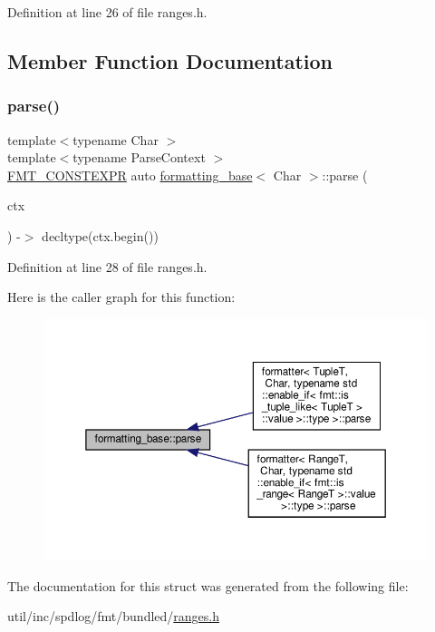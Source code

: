 Definition at line 26 of file ranges.\+h.



\subsection{Member Function Documentation}
\mbox{\label{structformatting__base_a938ab5ae1cf866f08caa3314d779c03e}} 
\subsubsection{\texorpdfstring{parse()}{parse()}}
{\footnotesize\ttfamily template$<$typename Char $>$ \\
template$<$typename Parse\+Context $>$ \\
\hyperlink{core_8h_a69201cb276383873487bf68b4ef8b4cd}{F\+M\+T\+\_\+\+C\+O\+N\+S\+T\+E\+X\+PR} auto \hyperlink{structformatting__base}{formatting\+\_\+base}$<$ Char $>$\+::parse (\begin{DoxyParamCaption}\item[{Parse\+Context \&}]{ctx }\end{DoxyParamCaption}) -\/$>$ decltype(ctx.\+begin()) \hspace{0.3cm}{\ttfamily [inline]}}



Definition at line 28 of file ranges.\+h.

Here is the caller graph for this function\+:
\nopagebreak
\begin{figure}[H]
\begin{center}
\leavevmode
\includegraphics[width=350pt]{structformatting__base_a938ab5ae1cf866f08caa3314d779c03e_icgraph}
\end{center}
\end{figure}


The documentation for this struct was generated from the following file\+:\begin{DoxyCompactItemize}
\item 
util/inc/spdlog/fmt/bundled/\hyperlink{ranges_8h}{ranges.\+h}\end{DoxyCompactItemize}

